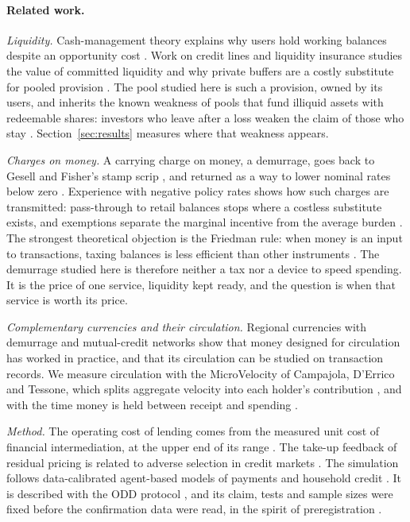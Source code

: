 \documentclass[10pt,a4paper]{article}
\theoremstyle{remark}
\begin{document}
\paragraph{Related work.}
\emph{Liquidity.} Cash-management theory explains why users hold working
balances despite an opportunity cost \cite{baumol,millerorr}. Work on credit
lines and liquidity insurance studies the value of committed liquidity and
why private buffers are a costly substitute for pooled provision
\cite{diamonddybvig,holmstrom,acharya,sufi}. The pool studied here is such a
provision, owned by its users, and inherits the known weakness of pools
that fund illiquid assets with redeemable shares: investors who leave after
a loss weaken the claim of those who stay \cite{chengoldstein,goldsteinbond,
schmidt}. Section~\ref{sec:results} measures where that weakness appears.

\emph{Charges on money.} A carrying charge on money, a demurrage, goes back to Gesell
\cite{gesell} and Fisher's stamp scrip \cite{fisher,champ}, and returned
as a way to lower nominal rates below zero \cite{goodfriend,buiter}.
Experience with negative policy rates shows how such charges are transmitted:
pass-through to retail balances stops where a costless substitute exists,
and exemptions separate the marginal incentive from the average burden
\cite{eggertsson,fuster,hongkandrac}. The strongest theoretical objection is
the Friedman rule: when money is an input to transactions, taxing balances is
less efficient than other instruments \cite{correiateles,cck}. The demurrage
studied here is therefore neither a tax nor a device to speed spending. It is
the price of one service, liquidity kept ready, and the question is when that
service is worth its price.

\emph{Complementary currencies and their circulation.} Regional currencies
with demurrage \cite{gelleri,hayashi} and mutual-credit networks
\cite{stodder,stodderlietaer,iosifidis,mattsson} show that money designed for
circulation has worked in practice, and that its circulation can be studied
on transaction records. We measure circulation with the MicroVelocity of
Campajola, D'Errico and Tessone, which splits aggregate velocity into each
holder's contribution \cite{campajola,decollibus}, and with the time money is
held between receipt and spending \cite{campajola,zhang}.

\emph{Method.} The operating cost of lending comes from the measured unit
cost of financial intermediation, at the upper end of its range
\cite{philippon}. The take-up feedback of residual pricing is related to
adverse selection in credit markets \cite{stiglitzweiss}. The simulation
follows data-calibrated agent-based models of payments and
household credit \cite{galbiati,baptista,poledna}. It is described with the
ODD protocol \cite{grimm}, and its claim, tests and sample sizes were fixed
before the confirmation data were read, in the spirit of preregistration
\cite{nosek}.
\end{document}
